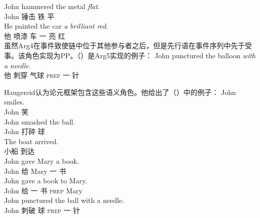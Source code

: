 \begin{exe}
\begin{xlist}[iv.]
\begin{exe}
\begin{xlist}[iv.]
\ex 
\gll John hammered the metal \emph{flat}.\\
     John 锤击  铁 平\\
\ex 
\gll He painted the car \emph{a} \emph{brilliant} \emph{red}.\\
     他 喷漆  车 一 亮 红\\
\zl
虽然Arg4在事件致使链中位于其他参与者之后，但是先行语在事件序列中先于受事。该角色实现为PP。（）是Arg5实现的例子：
\ea
\gll John punctured the balloon \emph{with} \emph{a} \emph{needle}.\\
     他 刺穿  气球 \textsc{prep} 一 针\\
\z

\noindent
Haugereid认为论元框架包含这些语义角色。他给出了（）中的例子：
\eal
\settowidth{}
\ex 
\gll John smiles.           \\
     John 笑\\
\ex 
\gll John smashed the ball. \\
     John 打碎  球\\
\ex 
\gll The boat arrived.      \\
      小船 到达\\
\ex
\gll John gave Mary a book. \\
     John 给 Mary 一 书\\
\ex 
\gll John gave a book to Mary.\\
     John 给 一 书 \textsc{prep} Mary\\ 
\ex
\gll John punctured the ball with a needle. \\
     John 刺破  球 \textsc{prep} 一 针\\
\zl


\end{xlist}
\end{exe}
\end{xlist}
\end{exe}
